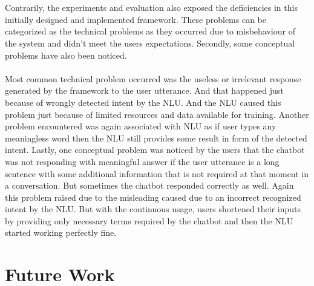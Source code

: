 \\~\\
Contrarily, the experiments and evaluation also exposed the deficiencies in this initially designed and implemented framework. These problems can be categorized as the technical problems as they occurred due to misbehaviour of the system and didn't meet the users expectations. Secondly, some conceptual problems have also been noticed.
\\~\\
Most common technical problem occurred was the useless or irrelevant response generated by the framework to the user utterance. And that happened just because of wrongly detected intent by the NLU. And the NLU caused this problem just because of limited resources and data available for training. Another problem encountered was again associated with NLU as if user types any meaningless word then the NLU still provides some result in form of the detected intent. Lastly, one conceptual problem was noticed by the users that the chatbot was not responding with meaningful answer if the user utterance is a long sentence with some additional information that is not required at that moment in a conversation. But sometimes the chatbot responded correctly as well. Again this problem raised due to the misleading caused due to an incorrect recognized intent by the NLU. But with the continuous usage, users shortened their inputs by providing only necessary terms required by the chatbot and then the NLU started working perfectly fine.

\section{Future Work}
